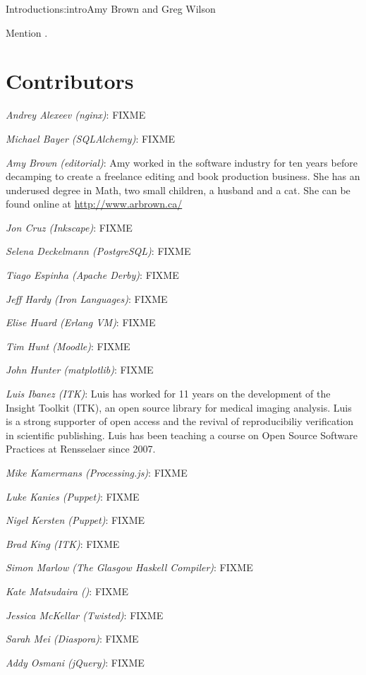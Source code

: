 \begin{aosachapter}{Introduction}{s:intro}{Amy Brown and Greg Wilson}

Mention \cite{bib:aosa1}.

\section*{Contributors}

\emph{Andrey Alexeev (nginx)}: FIXME

\emph{Michael Bayer (SQLAlchemy)}: FIXME

\emph{Amy Brown (editorial)}: Amy worked in the software industry for
ten years before decamping to create a freelance editing and book production
business. She has an underused degree in Math, two small children, a
husband and a cat. She can be found online at \url{http://www.arbrown.ca/}

\emph{Jon Cruz (Inkscape)}: FIXME

\emph{Selena Deckelmann (PostgreSQL)}: FIXME

\emph{Tiago Espinha (Apache Derby)}: FIXME

\emph{Jeff Hardy (Iron Languages)}: FIXME

\emph{Elise Huard (Erlang VM)}: FIXME

\emph{Tim Hunt (Moodle)}: FIXME

\emph{John Hunter (matplotlib)}: FIXME

\emph{Luis Ibanez (ITK)}: Luis has worked for 11 years on the development of
the Insight Toolkit (ITK), an open source library for medical imaging analysis.
Luis is a strong supporter of open access and the revival of reproducibiliy
verification in scientific publishing. Luis has been teaching a course on Open
Source Software Practices at Rensselaer since 2007.

\emph{Mike Kamermans (Processing.js)}: FIXME

\emph{Luke Kanies (Puppet)}: FIXME

\emph{Nigel Kersten (Puppet)}: FIXME

\emph{Brad King (ITK)}: FIXME

\emph{Simon Marlow (The Glasgow Haskell Compiler)}: FIXME

\emph{Kate Matsudaira ()}: FIXME

\emph{Jessica McKellar (Twisted)}: FIXME

\emph{Sarah Mei (Diaspora)}: FIXME

\emph{Addy Osmani (jQuery)}: FIXME


\end{aosachapter}
